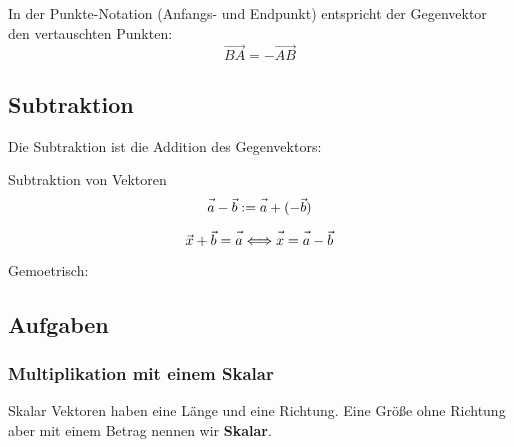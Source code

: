 \begin{bemerkung}{}{}
  In der Punkte-Notation (Anfangs- und Endpunkt) entspricht der
  Gegenvektor  den vertauschten Punkten:
  $$\overrightarrow{BA} = - \overrightarrow{AB}$$
\end{bemerkung}


\newpage


\subsection{Subtraktion}

Die Subtraktion ist die Addition des Gegenvektors:

\begin{definition}{Subtraktion von Vektoren}{}
  $$\vec{a\vphantom{b}} - \vec{b} := \vec{a\vphantom{b}} + (-\vec{b})$$
\end{definition}

\begin{bemerkung}{}{}
  $$\vec{x\vphantom{x}} + \vec{b} = \vec{a\vphantom{b}} \Longleftrightarrow \vec{x\vphantom{b}} = \vec{a\vphantom{b}} - \vec{b}$$
\end{bemerkung}

Gemoetrisch:


\subsection*{Aufgaben}
\newpage


\subsubsection{Multiplikation mit einem Skalar}
\begin{definition}{Skalar}{}
  Vektoren haben eine Länge und eine Richtung. Eine Größe ohne
  Richtung aber mit einem Betrag nennen wir \textbf{Skalar}. 
\end{definition}

